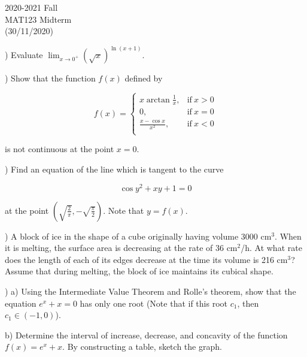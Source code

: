 \documentclass{article}
\begin{document}
\large

\begin{center}
2020-2021 Fall\\MAT123 Midterm\\(30/11/2020)
\end{center}

) Evaluate $\displaystyle\lim_{x\to0^+} (\sqrt x)^{\ln(x+1)}$.

\hfill

) Show that the function $f(x)$ defined by

\[
 f(x) =
\begin{cases}
\displaystyle x\arctan\frac{1}{x}, & \text{if}\ x > 0 \\
0, & \text{if}\ x = 0 \\
\displaystyle \frac{x-\cos x}{x^2}, & \text{if}\ x < 0 \\
\end{cases}
\]

\noindent is not continuous at the point $x=0$.

\hfill

) Find an equation of the line which is tangent to the curve

\begin{equation*}
\cos y^2 + xy + 1= 0
\end{equation*}

\noindent at the point $\displaystyle \left(\sqrt{\frac{2}{\pi}}, -\sqrt{\frac{\pi}{2}} \right)$. Note that $y=f(x)$.

\hfill

) A block of ice in the shape of a cube originally having volume 3000 cm$^3$. When it is melting, the surface area is decreasing at the rate of 36 cm$^2$/h. At what rate does the length of each of its edges decrease at the time its volume is 216 cm$^3$? Assume that during melting, the block of ice maintains its cubical shape.

\hfill

) a) Using the Intermediate Value Theorem and Rolle’s theorem, show that the equation $e^x + x = 0$ has only one root (Note that if this root $c_1$, then $c_1 \in (-1, 0)$).

\hfill

\noindent b) Determine the interval of increase, decrease, and concavity of the function $f(x) = e^x+x$. By constructing a table, sketch the graph.

\hfill
\end{document}
